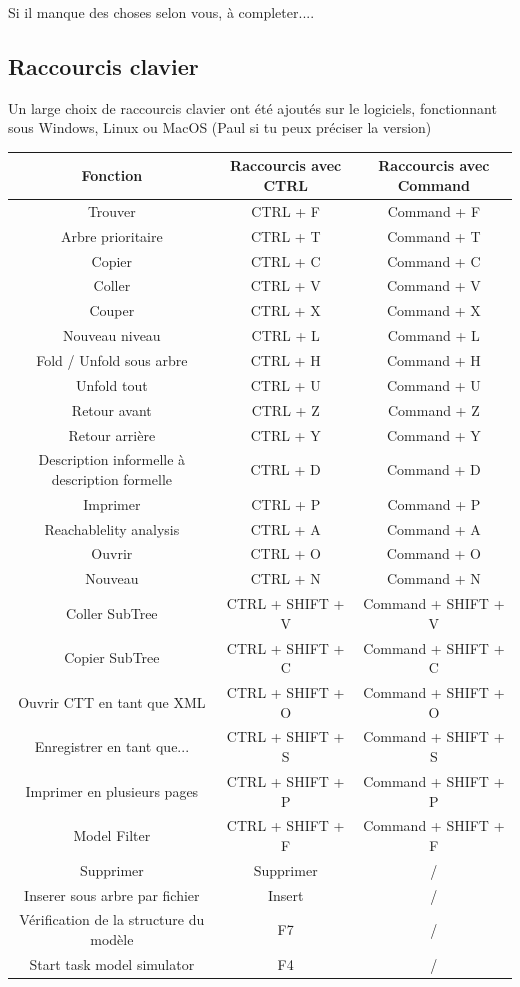 \documentclass[12pt, a4paper]{article}
\begin{document}
Si il manque des choses selon vous, à completer....
\subsection{Raccourcis clavier}

Un large choix de raccourcis clavier ont été ajoutés sur le logiciels, fonctionnant sous Windows, Linux ou MacOS (Paul si tu peux préciser la version)

\begin{tabular}{| c | c | c |}
\hline
Fonction & Raccourcis avec CTRL & Raccourcis avec Command \\ \hline
Trouver & CTRL + F & Command + F \\ \hline
Arbre prioritaire & CTRL + T & Command + T \\ \hline
Copier & CTRL + C & Command + C \\ \hline
Coller  & CTRL + V & Command + V \\ \hline
Couper & CTRL + X & Command + X \\ \hline
Nouveau niveau & CTRL + L & Command + L \\ \hline
Fold / Unfold sous arbre & CTRL + H & Command + H \\ \hline
Unfold tout & CTRL + U & Command + U \\ \hline
Retour avant & CTRL + Z & Command + Z \\ \hline
Retour arrière & CTRL + Y & Command + Y \\ \hline
Description informelle à description formelle & CTRL + D & Command + D \\ \hline
Imprimer & CTRL + P & Command + P \\ \hline
Reachablelity analysis  & CTRL + A & Command + A \\ \hline
Ouvrir & CTRL + O & Command + O \\ \hline
Nouveau & CTRL + N & Command + N \\ \hline
Coller SubTree & CTRL + SHIFT + V & Command + SHIFT + V \\ \hline
Copier SubTree & CTRL + SHIFT + C & Command + SHIFT + C \\ \hline
Ouvrir CTT en tant que XML  & CTRL + SHIFT + O & Command + SHIFT + O \\ \hline
Enregistrer en tant que... & CTRL + SHIFT + S & Command + SHIFT + S \\ \hline
Imprimer en plusieurs pages & CTRL + SHIFT + P & Command + SHIFT + P \\ \hline
Model Filter & CTRL + SHIFT + F & Command + SHIFT + F \\ \hline
Supprimer & Supprimer & / \\ \hline
Inserer sous arbre par fichier & Insert & / \\ \hline
Vérification de la structure du modèle & F7 & / \\ \hline
Start task model simulator & F4 & / \\ \hline
\end{tabular}
\end{document}
